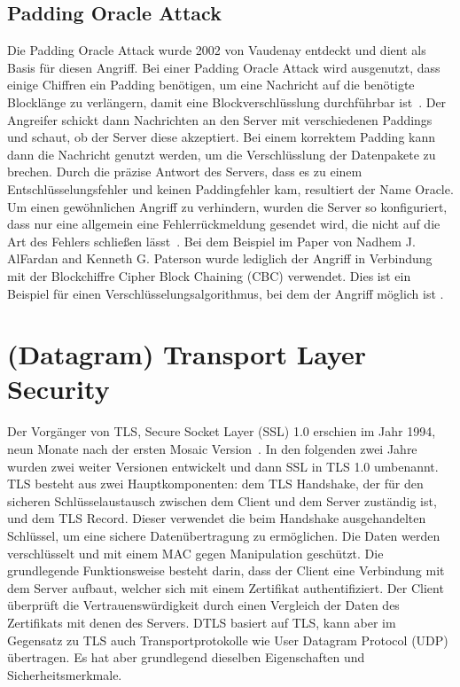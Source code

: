 \documentclass[a4paper,10pt]{scrartcl}
\begin{document}
    \subsection{Padding Oracle Attack}\label{subsec:padding-oracle-attack}
    Die Padding Oracle Attack wurde 2002 von Vaudenay entdeckt und dient als Basis für diesen Angriff.
    Bei einer Padding Oracle Attack wird ausgenutzt, dass einige Chiffren ein Padding benötigen, um eine Nachricht auf die benötigte Blocklänge zu verlängern, damit eine Blockverschlüsslung durchführbar ist~\cite[S.1]{Vaudenay2002}.
    Der Angreifer schickt dann Nachrichten an den Server mit verschiedenen Paddings und schaut, ob der Server diese akzeptiert.
    Bei einem korrektem Padding kann dann die Nachricht genutzt werden, um die Verschlüsslung der Datenpakete zu brechen.
    Durch die präzise Antwort des Servers, dass es zu einem Entschlüsselungsfehler und keinen Paddingfehler kam, resultiert der Name Oracle\cite{Rizzo2010}.
    Um einen gewöhnlichen Angriff zu verhindern, wurden die Server so konfiguriert, dass nur eine allgemein eine Fehlerrückmeldung gesendet wird, die nicht auf die Art des Fehlers schließen lässt~\cite[S.6]{Vaudenay2002}.
    \newline
    Bei dem Beispiel im Paper von Nadhem J. AlFardan and Kenneth G. Paterson wurde lediglich der Angriff in Verbindung mit der Blockchiffre Cipher Block Chaining (CBC) verwendet.
    Dies ist ein Beispiel für einen Verschlüsselungsalgorithmus, bei dem der Angriff möglich ist \cite{Vaudenay2002}.


    \section{(Datagram) Transport Layer Security}\label{sec:(d)tls}
    Der Vorgänger von TLS, Secure Socket Layer (SSL) 1.0 erschien im Jahr 1994, neun Monate nach der ersten Mosaic Version~\cite{Schwenk2022}.
    In den folgenden zwei Jahre wurden zwei weiter Versionen entwickelt und dann SSL in TLS 1.0 umbenannt.
    \newline
    TLS besteht aus zwei Hauptkomponenten: dem TLS Handshake, der für den sicheren Schlüsselaustausch zwischen dem Client und dem Server zuständig ist,
    und dem TLS Record.
    Dieser verwendet die beim Handshake ausgehandelten Schlüssel, um eine sichere Datenübertragung zu ermöglichen.
    Die Daten werden verschlüsselt und mit einem MAC gegen Manipulation geschützt.
    Die grundlegende Funktionsweise besteht darin, dass der Client eine Verbindung mit dem Server aufbaut, welcher sich mit einem Zertifikat authentifiziert.
    Der Client überprüft die Vertrauenswürdigkeit durch einen Vergleich der Daten des Zertifikats mit denen des Servers.
    \newline
    DTLS basiert auf TLS, kann aber im Gegensatz zu TLS auch Transportprotokolle wie User Datagram Protocol (UDP) übertragen.
    Es hat aber grundlegend dieselben Eigenschaften und Sicherheitsmerkmale.
\end{document}
